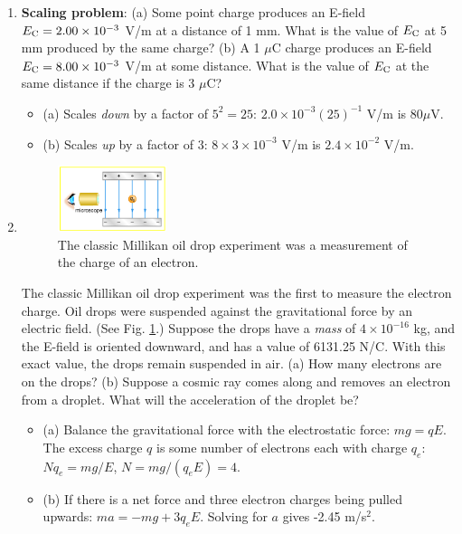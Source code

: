 \documentclass[10pt]{article}
\begin{document}
\begin{enumerate}
\item \textbf{Scaling problem}: (a) Some point charge produces an E-field $E_{\rm C} = 2.00 \times 10^{-3}$ V/m at a distance of 1 mm. What is the value of $E_{\rm C}$ at 5 mm produced by the same charge? (b) A 1 $\mu$C charge produces an E-field $E_{\rm C} = 8.00 \times 10^{-3}$ V/m at some distance.  What is the value of $E_{\rm C}$ at the same distance if the charge is 3 $\mu$C? \\
\begin{itemize}
\item (a) Scales \textit{down} by a factor of $5^2 = 25$: $2.0 \times 10^{-3} (25)^{-1}$ V/m is $80 \mu$V.
\item (b) Scales \textit{up} by a factor of $3$: $8 \times 3 \times 10^{-3}$ V/m is $2.4 \times 10^{-2}$ V/m.
\end{itemize}
\item 
\begin{figure}
\centering
\includegraphics[width=0.3\textwidth]{figures/mill.jpeg}
\caption{\label{fig:mill} The classic Millikan oil drop experiment was a measurement of the charge of an electron.}
\end{figure}
The classic Millikan oil drop experiment was the first to measure the electron charge. Oil drops were suspended against the gravitational force by an electric field. (See Fig. \ref{fig:mill}.) Suppose the drops have a \textit{mass} of $4\times 10^{-16}$ kg, and the E-field is oriented downward, and has a value of 6131.25 N/C.  With this exact value, the drops remain suspended in air.  (a)  How many electrons are on the drops?  (b) Suppose a cosmic ray comes along and removes an electron from a droplet.  What will the acceleration of the droplet be? \\
\begin{itemize}
\item (a) Balance the gravitational force with the electrostatic force: $mg = qE$.  The excess charge $q$ is some number of electrons each with charge $q_e$: $N q_e = mg/E$, $N = mg/(q_e E) = 4$.
\item (b) If there is a net force and three electron charges being pulled upwards: $ma = -mg + 3 q_e E$.  Solving for $a$ gives -2.45 m/s$^2$.
\end{itemize}
\end{enumerate}
\end{document}
